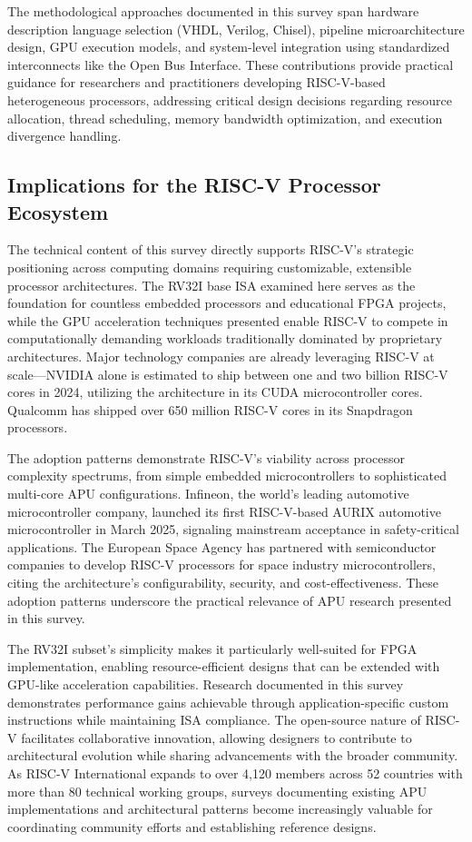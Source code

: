 \documentclass[a4paper,twoside]{article}
\begin{document}
The methodological approaches documented in this survey span hardware description language selection (VHDL, Verilog, Chisel), pipeline microarchitecture design, GPU execution models, and system-level integration using standardized interconnects like the Open Bus Interface. These contributions provide practical guidance for researchers and practitioners developing RISC-V-based heterogeneous processors, addressing critical design decisions regarding resource allocation, thread scheduling, memory bandwidth optimization, and execution divergence handling.

\subsection{Implications for the RISC-V Processor Ecosystem}
The technical content of this survey directly supports RISC-V's strategic positioning across computing domains requiring customizable, extensible processor architectures. The RV32I base ISA examined here serves as the foundation for countless embedded processors and educational FPGA projects, while the GPU acceleration techniques presented enable RISC-V to compete in computationally demanding workloads traditionally dominated by proprietary architectures. Major technology companies are already leveraging RISC-V at scale—NVIDIA alone is estimated to ship between one and two billion RISC-V cores in 2024, utilizing the architecture in its CUDA microcontroller cores. Qualcomm has shipped over 650 million RISC-V cores in its Snapdragon processors.

The adoption patterns demonstrate RISC-V's viability across processor complexity spectrums, from simple embedded microcontrollers to sophisticated multi-core APU configurations. Infineon, the world's leading automotive microcontroller company, launched its first RISC-V-based AURIX automotive microcontroller in March 2025, signaling mainstream acceptance in safety-critical applications. The European Space Agency has partnered with semiconductor companies to develop RISC-V processors for space industry microcontrollers, citing the architecture's configurability, security, and cost-effectiveness. These adoption patterns underscore the practical relevance of APU research presented in this survey.

The RV32I subset's simplicity makes it particularly well-suited for FPGA implementation, enabling resource-efficient designs that can be extended with GPU-like acceleration capabilities. Research documented in this survey demonstrates performance gains achievable through application-specific custom instructions while maintaining ISA compliance. The open-source nature of RISC-V facilitates collaborative innovation, allowing designers to contribute to architectural evolution while sharing advancements with the broader community. As RISC-V International expands to over 4,120 members across 52 countries with more than 80 technical working groups, surveys documenting existing APU implementations and architectural patterns become increasingly valuable for coordinating community efforts and establishing reference designs.
\end{document}
